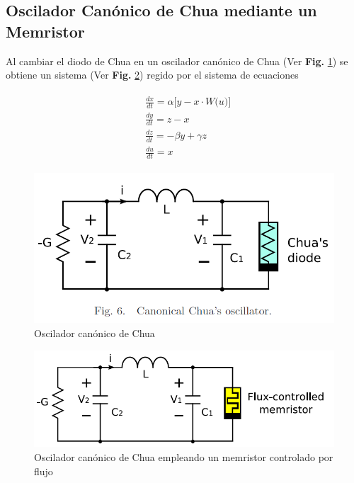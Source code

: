 \documentclass[11pt,letterpaper]{article}
\begin{document}
\begin{multicols*}{2}
\subsection*{Oscilador Canónico de Chua mediante un Memristor}

Al cambiar el diodo de Chua en un oscilador canónico de Chua (Ver \textbf{Fig.} \ref{Fig:CanonChuaOscilator}) se obtiene un sistema (Ver \textbf{Fig.} \ref{Fig:MemCanonChuaOscilator}) regido por el sistema de ecuaciones 

\begin{align}
\begin{split}
\label{Eq:MemCanChuaOscilator}
&\frac{dx}{dt} = \alpha\bigg[y - x\cdot W\big(u\big)\bigg] \\ 
&\frac{dy}{dt} = z - x   \\
&\frac{dz}{dt} = -\beta y + \gamma z \\
&\frac{du}{dt} = x
\end{split}
\end{align}

\begin{figure}[H]
    \centering
    \includegraphics[scale=0.25]{CanChuaOscilator.png}
    \caption{Oscilador canónico de Chua \cite{Itoh2008}}
    \label{Fig:CanonChuaOscilator}
\end{figure}

\begin{figure}[H]
    \centering
    \includegraphics[scale=0.25]{MemCanChuaOscilator.png}
    \caption{Oscilador canónico de Chua empleando un memristor controlado por flujo \cite{Itoh2008}}
    \label{Fig:MemCanonChuaOscilator}
\end{figure}


\end{multicols*}
\end{document}
